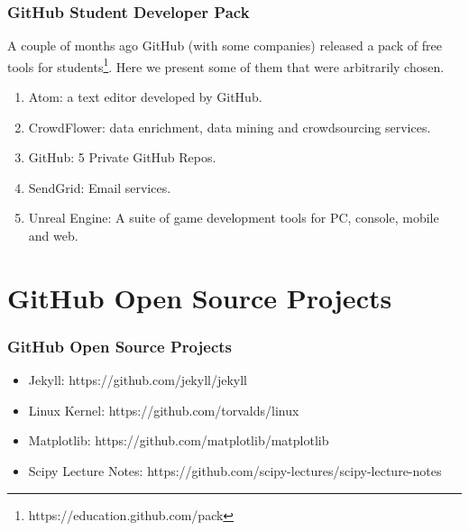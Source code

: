 \begin{frame}
    \frametitle{GitHub Student Developer Pack}
      
    A couple of months ago GitHub (with some companies) released a pack of free tools for students\footnote{https://education.github.com/pack}. Here we present some of them that were arbitrarily chosen.
    
    \begin{enumerate}    
    \item Atom: a text editor developed by GitHub. \pause
    
    \item CrowdFlower: data enrichment, data mining and crowdsourcing services. \pause
    
    \item GitHub: 5 Private GitHub Repos. \pause
    
    \item SendGrid: Email services. \pause
    
    \item Unreal Engine: A suite of game development tools for PC, console, mobile and web.
    \end{enumerate}

\end{frame}
    

\section[Open Source]{GitHub Open Source Projects}
\begin{frame}
    \frametitle{GitHub Open Source Projects}
    
\begin{itemize}    
	\item Jekyll: https://github.com/jekyll/jekyll \pause
        
    \item Linux Kernel: https://github.com/torvalds/linux \pause
    
    \item Matplotlib: https://github.com/matplotlib/matplotlib\pause
        
    \item Scipy Lecture Notes: https://github.com/scipy-lectures/scipy-lecture-notes
    
\end{itemize}   

\end{frame}


